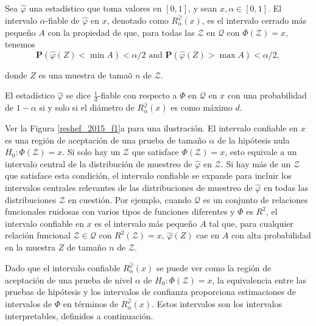 	\begin{defn}
		Sea $\hat{\varphi}$ una estad\'istico que toma valores en $[0,1]$, y sean $x, \alpha \in [0,1]$. El intervalo $\alpha$-fiable de $\hat{\varphi}$ en $x$, denotado como $R_\alpha^{\hat{\varphi}}(x)$, es el intervalo cerrado m\'as peque\~no $A$ con la propiedad de que, para todas las $\mathcal{Z}$ en $\mathcal{Q}$ con $\Phi(\mathcal{Z})=x$, tenemos
		$$
		\mathbf{P}(\hat{\varphi}(Z)<\min A)<\alpha / 2 \text { and } \mathbf{P}(\hat{\varphi}(Z)>\max A)<\alpha / 2,
		$$
		
		donde $Z$ es una muestra de tama\~o $n$ de $\mathcal{Z}$.
	\end{defn}

	El estad\'istico $\hat{\varphi}$ se dice $\frac{1}{d}$-fiable con respecto a $\Phi$ en $\mathcal{Q}$ en $x$ con una probabilidad de $1-\alpha$ si y solo si el di\'ametro de $R_\alpha^{\hat{\varphi}}(x)$ es como m\'aximo $d$.
	
		
	Ver la Figura \ref{reshef_2015_f1}a para una ilustraci\'on. El intervalo confiable en $x$ es una regi\'on de aceptaci\'on de una prueba de tama\~no $\alpha$ de la hip\'otesis nula $H_0: \Phi(\mathcal{Z})=x$. Si solo hay un $\mathcal{Z}$ que satisface $\Phi(\mathcal{Z})=x$, esto equivale a un intervalo central de la distribuci\'on de muestreo de $\hat{\varphi}$ en $\mathcal{Z}$. Si hay m\'as de un $\mathcal{Z}$ que satisface esta condici\'on, el intervalo confiable se expande para incluir los intervalos centrales relevantes de las distribuciones de muestreo de $\hat{\varphi}$ en todas las distribuciones $\mathcal{Z}$ en cuesti\'on. Por ejemplo, cuando $\mathcal{Q}$ es un conjunto de relaciones funcionales ruidosas con varios tipos de funciones diferentes y $\Phi$ es $R^2$, el intervalo confiable en $x$ es el intervalo m\'as peque\~no $A$ tal que, para cualquier relaci\'on funcional $\mathcal{Z} \in \mathcal{Q}$ con $R^2(\mathcal{Z})=x$, $\hat{\varphi}(Z)$ cae en $A$ con alta probabilidad en la muestra $Z$ de tama\~no $n$ de $\mathcal{Z}$.

	Dado que el intervalo confiable $R_\alpha^{\hat{\varphi}}(x)$ se puede ver como la regi\'on de aceptaci\'on de una prueba de nivel $\alpha$ de $H_0: \Phi(\mathcal{Z})=x$, la equivalencia entre las pruebas de hip\'otesis y los intervalos de confianza proporciona estimaciones de intervalos de $\Phi$ en t\'erminos de $R_\alpha^{\hat{\varphi}}(x)$. Estos intervalos son los intervalos interpretables, definidos a continuaci\'on.


